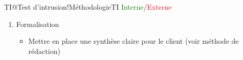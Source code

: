 \documentclass[twoside,a4paper,12pt,titlepage]{book}
\begin{document}
\begin{landscape}
\begin{Recap}{TI@Test d'intrusion!Méthodologie}{TI \textcolor{Green}{Interne}/\textcolor{red}{Externe}}
\begin{enumerate}
\begin{itemize}
				\item Utilisation d’exploits contrôlés ou validés par la communauté.
				\begin{itemize}
					\item[\rightturn] Retour vers la phase d’acquisition active en cas de résultat positif 
				\end{itemize}
				\item Formaliser les résultats par risques/impact
				\begin{itemize}
					\item[\Stopsign] En cas de vulnérabilité présentant un risque/impact important, informer immédiatement le client.
				\end{itemize}
			\end{itemize}
			\item Formalisation
			\begin{itemize}
				\item Mettre en place une synthèse claire pour le client (voir méthode de rédaction)
			\end{itemize}
		\end{enumerate}
		\tcblower
		\begin{center}
			\usebox\SchematicsBox
		\end{center}
	\end{Recap}
	\normalsize
\end{landscape}
\end{document}
